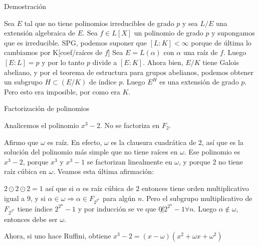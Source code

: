\documentclass[10pt,spanish]{beamer}
\def\F{\mathbb{F}}
\begin{document}

\begin{frame}[fragile]{Demostración}

\small{Sea $E$ tal que no tiene polinomios irreducibles de grado $p$ y sea $L/E$ una extensión algebraica de $E$. Sea $f \in L[X]$ un polinomio de grado $p$ y supongamos que es irreducible. SPG, podemos suponer que $[L:K] < \infty$ porque de última lo cambiamos por K[coef/raíces de $f$] 
Sea $E=L(\alpha)$ con $\alpha$ una raíz de $f$. Luego $[E:L]=p$ y por lo tanto $p$ divide a $[E:K]$. Ahora bien, $E/K$ tiene Galois abeliano, y por el teorema de estructura para grupos abelianos, podemos obtener un subgrupo $H \subset(E/K)$ de índice $p$. Luego $E^H$ es una extensión de grado $p$. Pero esto era imposible, por como era $K$.}



\begin{center}
\end{center}
\end{frame}


\begin{frame}{Factorización de polinomios}

Analicemos el polinomio $x^3 - 2$. No se factoriza en $F_2$.

Afirmo que $\omega$ es raíz. En efecto, $\omega$ es la clausura cuadrática de $2$, así que es la solución del polinomio más simple que no tiene raíces en $\omega$. Ese polinomio es $x^3-2$, porque $x^3$ y $x^3-1$ se factorizan linealmente en $\omega$, y porque $2$ no tiene raíz cúbica en $\omega$. Veamos esta última afirmación:

$2 \odot 2 \odot 2 = 1$ así que si $\alpha$ es raíz cúbica de $2$ entonces tiene orden multiplicativo igual a $9$, y si $\alpha \in \omega \Rightarrow \alpha \in F_{2^{2^n}}$ para algún $n$. Pero el subgrupo multiplicativo de $F_{2^{2^n}}$ tiene índice $2^{2^n}-1$ y por inducción se ve que $0\not| 2^{2^n}-1 \forall n$. Luego $\alpha \not\in \omega$, entonces debe ser $\omega$.

Ahora, si uno hace Ruffini, obtiene $x^3-2 = (x-\omega) (x^2 + \omega x + \omega^2)$

\end{frame}
\end{document}
